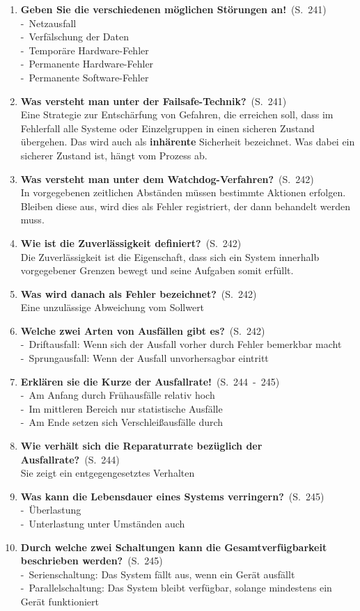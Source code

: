 \documentclass[a4paper,12pt]{article}
\newcommand{\question}[3]{\pagebreak[3]\item {\textbf{#1?}}\ (S.\ #2)#3}
\newcommand{\statement}[3]{\pagebreak[3]\item {\textbf{#1!}}\ (S.\ #2)#3}
\newcommand{\catchword}[1]{\\-\ #1}
\newcommand{\normaltext}[1]{\\#1}
\newcommand{\page}[1]{#1}
\newcommand{\pages}[2]{#1\ -\ #2}
\newcommand{\important}[1]{\textbf{#1}}
\begin{document}
\begin{enumerate}
  \statement{Geben Sie die verschiedenen möglichen Störungen an}{\page{241}}
  {
    \catchword{Netzausfall}
    \catchword{Verfälschung der Daten}
    \catchword{Temporäre Hardware-Fehler}
    \catchword{Permanente Hardware-Fehler}
    \catchword{Permanente Software-Fehler}
  }

  \question{Was versteht man unter der Failsafe-Technik}{\page{241}}
  {
    \normaltext{Eine Strategie zur Entschärfung von Gefahren, die erreichen soll,
                dass im Fehlerfall alle Systeme oder Einzelgruppen in einen sicheren
                Zustand übergehen. Das wird auch als \important{inhärente} Sicherheit
                bezeichnet. Was dabei ein sicherer Zustand ist, hängt vom Prozess ab.}
  }

  \question{Was versteht man unter dem Watchdog-Verfahren}{\page{242}}
  {
    \normaltext{In vorgegebenen zeitlichen Abständen müssen bestimmte Aktionen erfolgen.
                Bleiben diese aus, wird dies als Fehler registriert, der dann behandelt
                werden muss.}
  }

  \question{Wie ist die Zuverlässigkeit definiert}{\page{242}}
  {
    \normaltext{Die Zuverlässigkeit ist die Eigenschaft, dass sich ein System innerhalb
                vorgegebener Grenzen bewegt und seine Aufgaben somit erfüllt.}
  }

  \question{Was wird danach als Fehler bezeichnet}{\page{242}}
  {
    \normaltext{Eine unzulässige Abweichung vom Sollwert}
  }

  \question{Welche zwei Arten von Ausfällen gibt es}{\page{242}}
  {
    \catchword{Driftausfall: Wenn sich der Ausfall vorher durch Fehler bemerkbar macht}
    \catchword{Sprungausfall: Wenn der Ausfall unvorhersagbar eintritt}
  }

  \statement{Erklären sie die Kurze der Ausfallrate}{\pages{244}{245}}
  {
    \catchword{Am Anfang durch Frühausfälle relativ hoch}
    \catchword{Im mittleren Bereich nur statistische Ausfälle}
    \catchword{Am Ende setzen sich Verschleißausfälle durch}
  }

  \question{Wie verhält sich die Reparaturrate bezüglich der Ausfallrate}{\page{244}}
  {
    \normaltext{Sie zeigt ein entgegengesetztes Verhalten}
  }

  \question{Was kann die Lebensdauer eines Systems verringern}{\page{245}}
  {
    \catchword{Überlastung}
    \catchword{Unterlastung unter Umständen auch}
  }

  \question{Durch welche zwei Schaltungen kann die Gesamtverfügbarkeit beschrieben
            werden}{\page{245}}
  {
    \catchword{Serienschaltung: Das System fällt aus, wenn ein Gerät ausfällt}
    \catchword{Parallelschaltung: Das System bleibt verfügbar, solange mindestens ein
               Gerät funktioniert}
  }


\end{enumerate}
\end{document}
